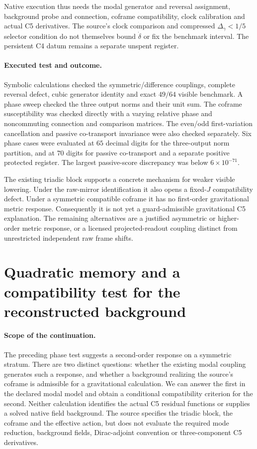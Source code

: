 \documentclass[11pt,a4paper]{article}
\begin{document}
Native execution thus needs the modal generator and reversal
assignment, background probe and connection, coframe compatibility,
clock calibration and actual C5 derivatives. The source's clock
comparison and compressed $\Delta_\gamma<1/5$ selector condition
do not themselves bound $\dot\delta$ or fix the benchmark interval.
The persistent C4 datum remains a separate unspent register.

\paragraph{Executed test and outcome.}
Symbolic calculations checked the symmetric/difference couplings,
complete reversal defect, cubic generator identity and exact
$49/64$ visible benchmark. A phase sweep checked the three output
norms and their unit sum. The coframe susceptibility was checked
directly with a varying relative phase and noncommuting connection
and comparison matrices. The even/odd first-variation cancellation
and passive co-transport invariance were also checked separately.
Six phase cases were evaluated at $65$ decimal digits for the
three-output norm partition, and at $70$ digits for passive
co-transport and a separate positive protected register. The
largest passive-score discrepancy was below $6\times10^{-71}$.

The existing triadic block supports a concrete mechanism for weaker
visible lowering. Under the raw-mirror identification it also opens
a fixed-$J$ compatibility defect. Under a symmetric compatible
coframe it has no first-order gravitational metric response.
Consequently it is not yet a guard-admissible gravitational C5
explanation. The remaining alternatives are a justified asymmetric
or higher-order metric response, or a licensed projected-readout
coupling distinct from unrestricted independent raw frame shifts.

\section{Quadratic memory and a compatibility test for the reconstructed background}
\label{sec:quadratic-memory-background-test}

\paragraph{Scope of the continuation.}
The preceding phase test suggests a second-order response on a symmetric
stratum. There are two distinct questions: whether the existing modal
coupling generates such a response, and whether a background realizing the
source's coframe is admissible for a gravitational calculation. We can
answer the first in the declared modal model and obtain a conditional
compatibility criterion for the second. Neither calculation identifies the
actual C5 residual functions or supplies a solved native field background.
The source specifies the triadic block, the coframe and the effective
action, but does not evaluate the required mode reduction, background
fields, Dirac-adjoint convention or three-component C5 derivatives.
\end{document}
